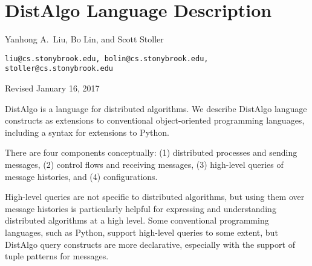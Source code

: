 \documentclass[12pt]{article}
\newcommand{\notes}[1]{} %
\newcommand{\body}[1]{} %
\newcommand{\mysubsec}[1]{\subsection*{#1}}
\newcommand{\myparag}[1]{\vspace{2ex}\noindent\b{#1.}~}
\newcommand{\m}[1]{$#1$} %
\renewcommand{\c}[1]{{\tt\small #1}} %
\renewcommand{\b}[1]{{\bf #1}} %
\renewcommand{\|}{\mathify{\,\mbox{\c{|}}\,}} %
\renewcommand{\=}{\mathify{\,=\,}\linebreak[0]}
\begin{document}
\body{} %

\newpage
\appendix

\renewcommand{\thesection}{\arabic{section}}

\setcounter{page}{1}
\setcounter{section}{0}


\notes{}

\section*{{\Large DistAlgo Language Description}}

{\large Yanhong A.\ Liu, Bo Lin, and Scott Stoller}

\c{liu@cs.stonybrook.edu, bolin@cs.stonybrook.edu, stoller@cs.stonybrook.edu}

{\small Revised January 16, 2017}
\vspace{4ex}

\def\da{\vspace{-2.5ex}in DistAlgo\vspace{-2.5ex}}
\def\langmap{\vspace{.5ex}\m{\longrightarrow}~\b{in Python syntax:~}
  \vspace{.0ex}}
\renewcommand{\mysubsec}[1]{\section{#1}}
\renewcommand{\myparag}[1]{\subsection{#1}}


DistAlgo is a language for distributed algorithms.  We describe DistAlgo
language constructs as extensions to conventional object-oriented
programming languages, including a syntax for extensions to Python.

There are four components conceptually: (1) distributed processes and
sending messages, (2) control flows and receiving messages, (3) high-level
queries of message histories, and (4) configurations.

High-level queries are not specific to distributed algorithms, but using
them over message histories is particularly helpful for expressing and
understanding distributed algorithms at a high level.  Some conventional
programming languages, such as Python, support high-level queries to some
extent, but DistAlgo query constructs are more declarative, especially with
the support of tuple patterns for messages.
\end{document}
